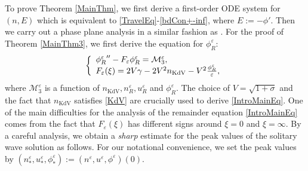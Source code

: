 \documentclass{amsart}
\newcommand{\veps}{\varepsilon}
\numberwithin{equation}{section}
\theoremstyle{plain}%
\theoremstyle{definition}
\theoremstyle{remark}
\theoremstyle{remark}
\begin{document}
To prove Theorem \ref{MainThm}, 
we first derive a first-order ODE system for $(n,E)$ which is equivalent to \eqref{TravelEq}-\eqref{bdCon+-inf}, where   $E:=-\phi'$. Then we carry out a phase plane analysis in a similar fashion as  \cite{Cor}.
For the proof of Theorem \ref{MainThm3},
we first derive the equation for $\phi_R^\veps$:
\begin{equation}\label{IntroMainEq}
\left\{
\begin{array}{l l}
{\phi_{R}^\veps}'' - F_{\veps}\phi_R^\veps = \mathcal{M}_3^\veps,  \\ 
F_\veps(\xi) =  2V\gamma  - 2V^2 n_{\text{KdV}} - V^2\frac{\phi_R^\veps}{\veps},
\end{array} 
\right.
\end{equation}
where $\mathcal{M}_3^\veps$ is a function of $n_{\text{KdV}}, n^\veps_{R}, u^\veps_{R}$ and $\phi^\veps_{R}$. The choice of $V=\sqrt{1+\sigma}$ and the fact that $n_{\text{KdV}}$ satisfies \eqref{KdV} are crucially used to derive \eqref{IntroMainEq}.  One of the main difficulties for the analysis of the remainder equation \eqref{IntroMainEq} comes from the fact that $F_\veps(\xi)$ has different signs around $\xi=0$ and $\xi=\infty$. 
 By a careful analysis, we  obtain a  \emph{sharp} estimate for  the peak values of the solitary wave solution as follows.  For our notational convenience, we set the peak values by $(n_*^\veps, u_*^\veps, \phi_*^\veps) := (n^\veps,u^\veps,\phi^\veps)(0)$.  
\end{document}
